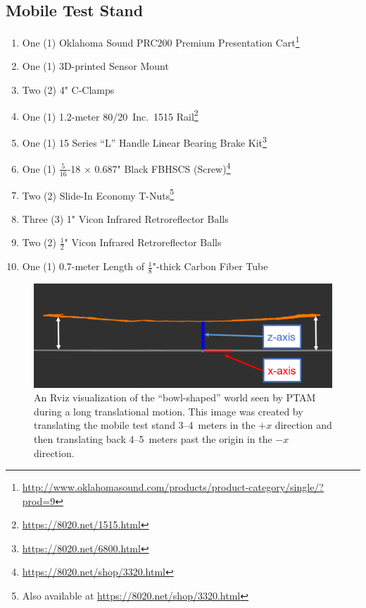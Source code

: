 \subsection{Mobile Test Stand}
\begin{enumerate}
\item One (1) Oklahoma Sound PRC200 Premium Presentation Cart\footnote{\url{http://www.oklahomasound.com/products/product-category/single/?prod=9}}
\item One (1) 3D-printed Sensor Mount
\item Two (2) 4" C-Clamps
\item One (1) 1.2-meter 80/20\textsuperscript{\textregistered}~Inc.\ 1515 Rail\footnote{\url{https://8020.net/1515.html}}
\item One (1) 15 Series ``L'' Handle Linear Bearing Brake Kit\footnote{\url{https://8020.net/6800.html}}
\item One (1) $\frac{5}{16}$-18 $\times$ 0.687" Black FBHSCS (Screw)\footnote{\url{https://8020.net/shop/3320.html}}
\item Two (2) Slide-In Economy T-Nuts\footnote{Also available at \url{https://8020.net/shop/3320.html}}
\item Three (3) 1" Vicon Infrared Retroreflector Balls
\item Two (2) $\frac{1}{2}$" Vicon Infrared Retroreflector Balls
\item One (1) 0.7-meter Length of $\frac{1}{8}$"-thick Carbon Fiber Tube
\end{enumerate}
\pagebreak

\begin{figure}
  \centering
    \includegraphics[width=\textwidth]{bowl-shaped_world}
  \caption[Rviz Visualization of Translational (Lens) Distortion]{An Rviz visualization of the ``bowl-shaped'' world seen by PTAM during a long translational motion. This image was created by translating the mobile test stand 3--4~meters in the $+x$ direction and then translating back 4--5~meters past the origin in the $-x$ direction.}
  \label{fig:bowl-shaped_world}
\end{figure}

